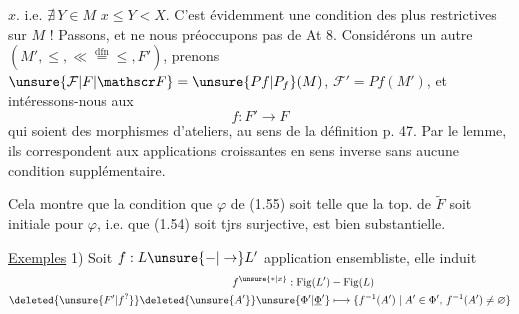 $x$. i.e. $\nexists\,Y\in M$  $x\leq Y<X$. C'est évidemment une condition des plus restrictives sur $M$ ! Passons, et ne nous préoccupons pas de At 8.
Considérons  un autre $(M',\leq,\ll\overset{\mathrm{dfn}}{=}\leq,F')$, prenons    $\unsure{\mathcal F|F|\mathscr F}=\unsure{Pf|P_f}(M)$, $\mathcal F'=Pf(M')$, et intéressons-nous aux
\[
f:F'\longrightarrow F
\]
 qui soient des morphismes d'ateliers, au sens de la définition p. 47. Par le lemme, ils correspondent aux  applications croissantes en sens inverse
sans aucune condition supplémentaire.

Cela montre que la condition que $\varphi$ de (1.55) soit telle que la top. de $\widetilde F$ soit  initiale pour $\varphi$, i.e. que (1.54) soit tjrs surjective, est bien substantielle.

\uline{Exemples} 1) Soit $f:L\unsure{-|\to}L'$ application ensembliste, elle induit 
\[
\begin{aligned}
f^{\unsure{*|x}}:\operatorname{Fig}(L')&-\operatorname{Fig}(L)\\
\deleted{\unsure{F'|f^{?}}}\deleted{\unsure{A'}}\unsure{\Phi'|\underline{\Phi}'}&\longmapsto\{f^{-1}(A')\mid A'\in\Phi',\, f^{-1}(A')\ne\varnothing\}
\end{aligned}
\]
